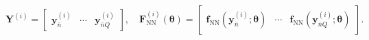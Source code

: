 \documentclass[final]{siamltex}
\newcommand{\jrp}[1]{{\color{orange}{#1}}}
\newcommand{\bfa}[1]{\boldsymbol{#1}}
\begin{document}
\begin{equation*}
\bfa{Y}^{(i)} = \begin{bmatrix}
    \bfa{y}_{\bar{n}}^{(i)} & \cdots & \bfa{y}_{\bar{n}Q}^{(i)} 
\end{bmatrix}, \quad 
\bfa{F}_{\text{NN}}^{(i)}(\bfa{\theta}) = 
\begin{bmatrix}
    \bfa{f}_{\text{NN}}(\bfa{y}_{\bar{n}}^{(i)};\bfa{\theta}) & \cdots & \bfa{f}_{\text{NN}}(\bfa{y}_{\bar{n}Q}^{(i)};\bfa{\theta})
\end{bmatrix}.
\end{equation*}


\end{document}
